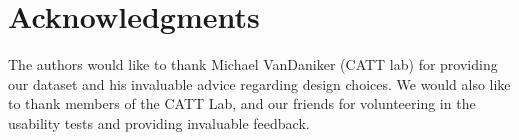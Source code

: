 \documentclass[journal]{vgtc}
\begin{document}
\section{Acknowledgments}
The authors would like to thank Michael VanDaniker (CATT lab) for providing our dataset and his invaluable advice regarding design choices. We would also like to thank members of the CATT Lab, and our friends for volunteering in the usability tests and providing invaluable feedback. 



\end{document}
